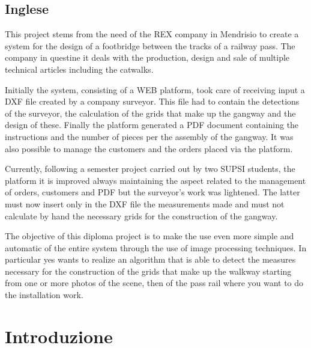 \documentclass[twoside]{supsistudent}
\begin{document}
\newpage
\section{Inglese}
This project stems from the need of the REX company in Mendrisio to create a system
for the design of a footbridge between the tracks of a railway pass. The company
in questine it deals with the production, design and sale of multiple
technical articles including the catwalks.

\bigskip
Initially the system, consisting of a WEB platform, took care of receiving input
a DXF file created by a company surveyor. This file had to contain the detections
of the surveyor, the calculation of the grids that make up the gangway and the design of these.
Finally the platform generated a PDF document containing the instructions and the number of pieces per
the assembly of the gangway. It was also possible to manage the customers and the orders placed
via the platform.

\bigskip
Currently, following a semester project carried out by two SUPSI students, the platform
it is improved always maintaining the aspect related to the management of orders, customers and PDF
but the surveyor's work was lightened. The latter must now insert only in the DXF file
the measurements made and must not calculate by hand the necessary grids for the construction of the gangway.

\bigskip
The objective of this diploma project is to make the use even more simple and automatic
of the entire system through the use of image processing techniques. In particular yes
wants to realize an algorithm that is able to detect the measures necessary for the construction
of the grids that make up the walkway starting from one or more photos of the scene, then of the pass
rail where you want to do the installation work.

\newpage
\chapter{Introduzione}
\end{document}
